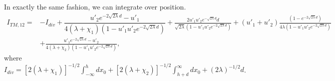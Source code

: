 
In exactly the same fashion, we can integrate over position.  
\begin{align}
I_{TM,12} =& -I_{div} + \dfrac{u'_2 e^{-2\sqrt{2\lambda}d}-u'_1}{4(\lambda+\chi_1)(1-u'_1u'_2 e^{-2\sqrt{2\lambda}d})} +\frac{2u'_1u'_2 e^{-\sqrt{2\lambda}d}d}{\sqrt{2\lambda}(1-u'_1u'_2 e^{-2\sqrt{2\lambda}d})} + (u'_1+u'_2)\frac{(1-e^{-2\sqrt{2\lambda}d})}{4\lambda(1-u'_1u'_2e^{-2\sqrt{2\lambda}d})}\nonumber\\
& +\frac{u'_1 e^{-2\sqrt{2\lambda}d} - u'_2}{4(\lambda+\chi_2)(1-u'_1u'_2 e^{-2\sqrt{2\lambda}d})},
\end{align}
where $I_{div} = [2(\lambda+\chi_1)]^{-1/2}\int_{-\infty}^h dx_0  +  [2(\lambda+\chi_2)]^{-1/2}\int_{h+d}^\infty dx_0  + (2\lambda)^{-1/2}d$.

